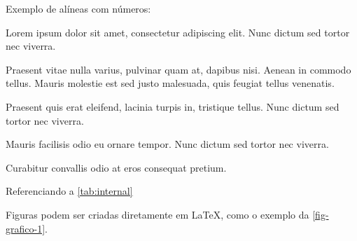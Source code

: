 
Exemplo de alíneas com números:

\begin{alineascomnumero}
	\item Lorem ipsum dolor sit amet, consectetur adipiscing elit. Nunc dictum sed tortor nec viverra.
	\item Praesent vitae nulla varius, pulvinar quam at, dapibus nisi. Aenean in commodo tellus. Mauris molestie est sed justo malesuada, quis feugiat tellus venenatis.
	\item Praesent quis erat eleifend, lacinia turpis in, tristique tellus. Nunc dictum sed tortor nec viverra.
	\item Mauris facilisis odio eu ornare tempor. Nunc dictum sed tortor nec viverra.
	\item Curabitur convallis odio at eros consequat pretium.
\end{alineascomnumero}

\lipsum[12]

\begin{table}[h!]	
	\centering
\end{table}

\lipsum[2] Referenciando a \autoref{tab:internal} \lipsum[2]

Figuras podem ser criadas diretamente em LaTeX,
como o exemplo da \ref{fig-grafico-1}.

